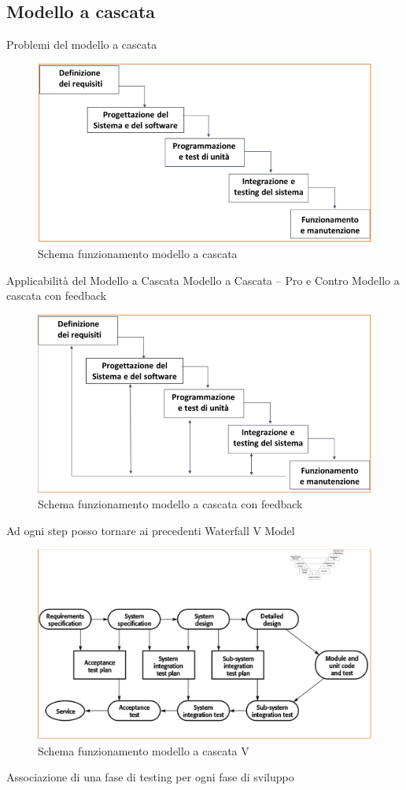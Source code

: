 \documentclass{article}
\begin{document}
	\subsection{Modello a cascata}
	Problemi del modello a cascata
	\begin{figure}[h]
		\centering
		\includegraphics[scale=0.3]{4.mod_cascata.png}
		\caption{Schema funzionamento modello a cascata}
	\end{figure}
	Applicabilità del Modello a Cascata
	Modello a Cascata – Pro e Contro
	Modello a cascata con feedback
	\begin{figure}[h]
	\centering
	\includegraphics[scale=0.3]{5.mod_cascata_fb.png}
	\caption{Schema funzionamento modello a cascata con feedback}
	\end{figure}
	Ad ogni step posso tornare ai precedenti
	Waterfall V Model
	\begin{figure}[h]
		\centering
		\includegraphics[scale=0.3]{6.mod_cascata_v.png}
		\caption{Schema funzionamento modello a cascata V}
	\end{figure}
	Associazione di una fase di testing per ogni fase di sviluppo
\end{document}
